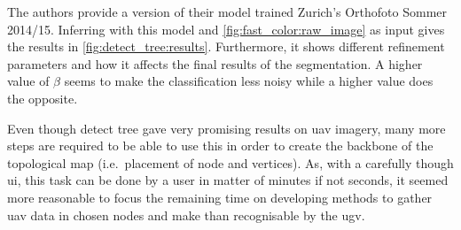 The authors provide a version of their model trained Zurich's Orthofoto Sommer 2014/15.
Inferring with this model and \cref{fig:fast_color:raw_image} as input gives the results in \cref{fig:detect_tree:results}.
Furthermore, it shows different refinement parameters and how it affects the final results of the segmentation.
A higher value of $\beta$ seems to make the classification less noisy while a higher value does the opposite.




Even though detect tree gave very promising results on \gls{uav} imagery, many more steps are required to be able
to use this in order to create the backbone of the topological map (i.e.\ placement of node and vertices).
As, with a carefully though \gls{ui}, this task can be done by a user in matter of minutes if not seconds, it seemed
more reasonable to focus the remaining time on developing methods to gather \gls{uav} data in chosen nodes and
make than recognisable by the \gls{ugv}.
